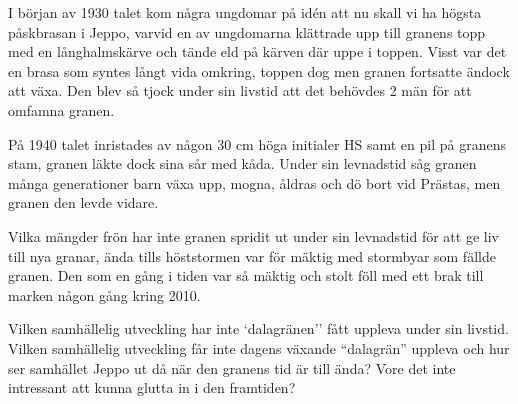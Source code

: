 I början av 1930 talet kom några ungdomar på idén att nu skall vi ha högsta påskbrasan i Jeppo, varvid en av ungdomarna klättrade upp till granens topp med en långhalmskärve och tände eld på kärven där uppe i toppen. Visst var det en brasa som syntes långt vida omkring, toppen dog men granen fortsatte ändock att växa. Den blev så tjock under sin livstid att det behövdes 2 män för att omfamna granen.

På 1940 talet inristades av någon 30 cm höga initialer HS samt en pil på granens stam, granen läkte dock sina sår med kåda. Under sin levnadstid såg granen många generationer barn växa upp, mogna, åldras och dö bort vid Prästas, men granen den levde vidare.

Vilka mängder frön har inte granen spridit ut under sin levnadstid för att ge liv till nya granar, ända tills höststormen var för mäktig med stormbyar som fällde granen. Den som en gång i tiden var så mäktig och stolt föll med ett brak till marken någon gång kring 2010.

Vilken samhällelig utveckling har inte `dalagränen'' fått uppleva under sin livstid. Vilken samhällelig utveckling får inte dagens växande ``dalagrän'' uppleva och hur ser samhället Jeppo ut då när den granens tid är till ända? Vore det inte intressant att kunna glutta in i den framtiden?

